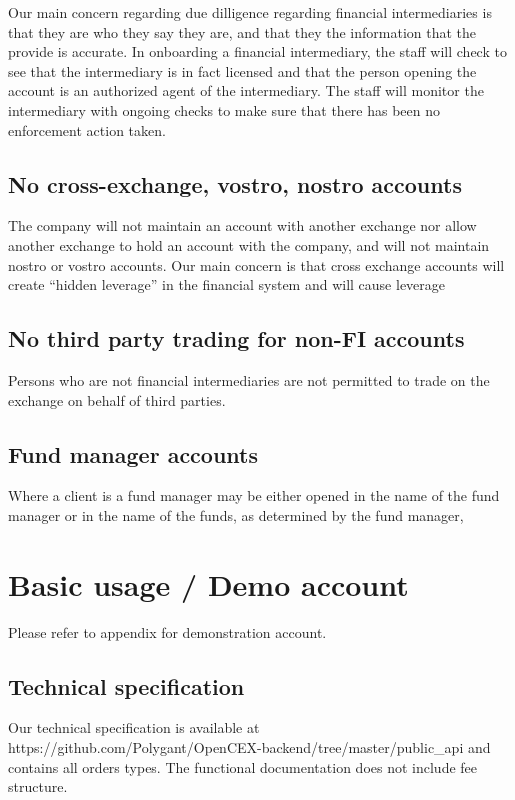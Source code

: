 Our main concern regarding due dilligence regarding financial
intermediaries is that they are who they say they are, and that they
the information that the provide is accurate.  In onboarding a
financial intermediary, the staff will check to see that the
intermediary is in fact licensed and that the person opening the
account is an authorized agent of the intermediary.  The staff will
monitor the intermediary with ongoing checks to make sure that there
has been no enforcement action taken.

\subsection{No cross-exchange, vostro, nostro accounts}
The company will not maintain an account with another exchange nor
allow another exchange to hold an account with the company, and will
not maintain nostro or vostro accounts.  Our main concern is that
cross exchange accounts will create ``hidden leverage'' in the
financial system and will cause leverage

\subsection{No third party trading for non-FI accounts}
Persons who are not financial intermediaries are not permitted to
trade on the exchange on behalf of third parties.

\subsection{Fund manager accounts}
Where a client is a fund manager may be either opened in the name of
the fund manager or in the name of the funds, as determined by the
fund manager,

\section{Basic usage / Demo account}
Please refer to appendix for demonstration account.

\subsection{Technical specification}
Our technical specification is available at
https://github.com/Polygant/OpenCEX-backend/tree/master/public\_api
and contains all orders types.  The functional documentation does not
include fee structure.

